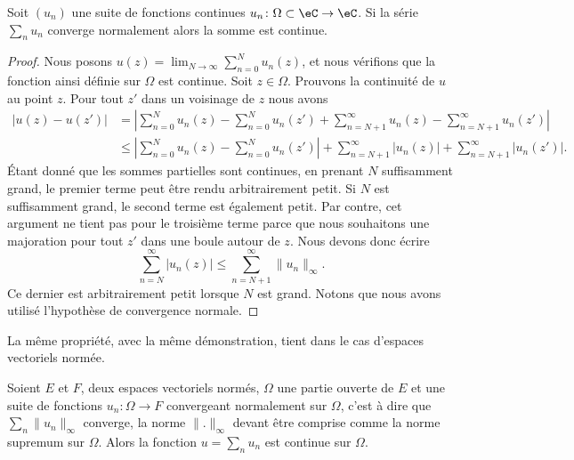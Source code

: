 \begin{proposition}     \label{PropUEMoNF}
    Soit \( (u_n)\) une suite de fonctions continues \( u_n\colon \Omega\subset\eC\to \eC\). Si la série \( \sum_nu_n\) converge normalement alors la somme est continue.
\end{proposition}

\begin{proof}
    Nous posons \( u(z)=\lim_{N\to \infty} \sum_{n=0}^N u_n(z)\), et nous vérifions que la fonction ainsi définie sur \( \Omega\) est continue. Soit \( z\in \Omega\). Prouvons la continuité de \( u\) au point \( z\). Pour tout \( z'\) dans un voisinage de \( z\) nous avons 
    \begin{subequations}
        \begin{align}
            \big| u(z)-u(z') \big|&=\left| \sum_{n=0}^{N}u_n(z)-\sum_{n=0}^{N}u_n(z')+\sum_{n=N+1}^{\infty}u_n(z)-\sum_{n=N+1}^{\infty}u_n(z') \right| \\
            &\leq \left| \sum_{n=0}^N u_n(z)-\sum_{n=0}^Nu_n(z') \right| +\sum_{n=N+1}^{\infty}| u_n(z) |+\sum_{n=N+1}^{\infty}| u_n(z') |.
        \end{align}
    \end{subequations}
    Étant donné que les sommes partielles sont continues, en prenant \( N\) suffisamment grand, le premier terme peut être rendu arbitrairement petit. Si \( N\) est suffisamment grand, le second terme est également petit. Par contre, cet argument ne tient pas pour le troisième terme parce que nous souhaitons une majoration pour tout \( z'\) dans une boule autour de \( z\). Nous devons donc écrire
    \begin{equation}
        \sum_{n=N}^{\infty}| u_n(z) |\leq \sum_{n=N+1}^{\infty}\| u_n \|_{\infty}.
    \end{equation}
    Ce dernier est arbitrairement petit lorsque \( N\) est grand. Notons que nous avons utilisé l'hypothèse de convergence normale.
\end{proof}

La même propriété, avec la même démonstration, tient dans le cas d'espaces vectoriels normée.
\begin{proposition} \label{PropOMBbwst}
    Soient \( E\) et \( F\), deux espaces vectoriels normés, \( \Omega\) une partie ouverte de \( E\) et une suite de fonctions \( u_n\colon \Omega\to F\) convergeant normalement sur \( \Omega\), c'est à dire que \( \sum_n\| u_n \|_{\infty}\) converge, la norme \( \| . \|_{\infty} \) devant être comprise comme la norme supremum sur \( \Omega\). Alors la fonction \( u=\sum_nu_n\) est continue sur \( \Omega\).
\end{proposition}

